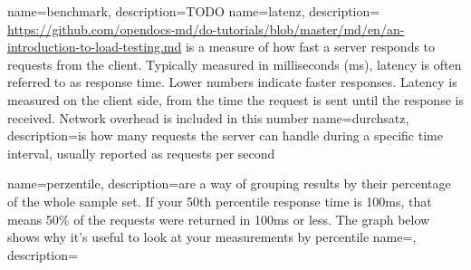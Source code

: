 {
    name=benchmark,
    description={TODO}
}
{
    name=latenz,
    description={
    \url{https://github.com/opendocs-md/do-tutorials/blob/master/md/en/an-introduction-to-load-testing.md}    
    is a measure of how fast a server responds to requests from the client. 
    Typically measured in milliseconds (ms), latency is often referred to as response time.
     Lower numbers indicate faster responses. Latency is measured on the client side, from the 
     time the request is sent until the response is received. Network overhead is included in this number}
}
{
    name=durchsatz,
    description={is how many requests the server can handle during a specific time interval, usually reported as requests per second}
}

{
    name=perzentile,
    description={are a way of grouping results by their percentage of the whole sample set. 
    If your 50th percentile response time is 100ms, that means 
    50\% of the requests were returned in 100ms or less. The graph below shows why it’s useful to look at your measurements by percentile}
}
{
    name=,
    description={}
}
